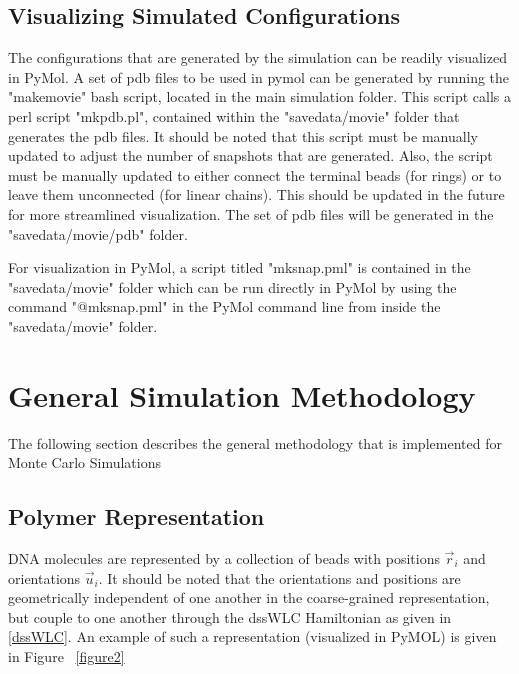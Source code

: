 \documentclass[english]{article}
\begin{document}
\subsection{Visualizing Simulated Configurations}
The configurations that are generated by the simulation can be readily visualized in PyMol. A set of pdb files to be used in pymol can be generated by running the "makemovie" bash script, located in the main simulation folder. This script calls a perl script "mkpdb.pl", contained within the "savedata/movie" folder that generates the pdb files. It should be noted that this script must be manually updated to adjust the number of snapshots that are generated. Also, the script must be manually updated to either connect the terminal beads (for rings) or to leave them unconnected (for linear chains). This should be updated in the future for more streamlined visualization. The set of pdb files will be generated in the "savedata/movie/pdb" folder. 

For visualization in PyMol, a script titled "mksnap.pml" is contained in the "savedata/movie" folder which can be run directly in PyMol by using the command "@mksnap.pml" in the PyMol command line from inside the "savedata/movie" folder.


\section{General Simulation Methodology} \label{simulation methodology}

The following section describes the general methodology that is implemented for Monte Carlo Simulations

\subsection{Polymer Representation}

DNA molecules are represented by a collection of beads with positions ${\vec{r}_i}$ and orientations ${\vec{u}_i}$. It should be noted that the orientations and positions are geometrically independent of one another in the coarse-grained representation, but couple to one another through the dssWLC Hamiltonian as given in \eqref{dssWLC}. An example of such a representation (visualized in PyMOL) is given in Figure ~\ref{figure2}
\end{document}
